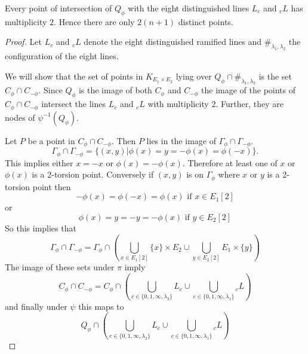 \documentclass[10pt,a4paper]{amsart}
\newcommand {\KE}{{K_{E_1 \times E_2}}}
\newcommand {\lb}{{\lambda}}
\begin{document}
\begin{lem} Every point of intersection of $Q_{\phi}$ with the  eight distinguished lines $L_c$ and ${}_cL$ has multiplicity $2$. Hence there are only  $2(n+1)$ distinct points. 
	\label{doubleintersection} 
\end{lem}

\begin{proof}
	
	Let $L_c$ and ${}_cL$ denote the eight distinguished ramified  lines and $\#_{\lb_1,\lb_2}$ the configuration of the eight lines. 
	
	
	 We will show that the set of points in $\KE$ lying over  $Q_{\phi} \cap  \#_{\lb_1,\lb_2}$  is  the set 
	$C_{\phi}\cap C_{-\phi}$. Since $Q_{\phi}$ is the image of both $C_{\phi}$ and $C_{-\phi}$ the image of the points of $C_{\phi} \cap C_{-\phi}$ intersect the lines $L_c$ and ${}_cL$  with  multiplicity $2$. Further, they are nodes of $\psi^{-1}(Q_{\phi})$.
	
	Let $P$ be a point in $C_{\phi} \cap C_{-\phi}$. Then $P$ lies in the image of $\Gamma_{\phi} \cap \Gamma_{-\phi}$. 
	$$\Gamma_{\phi} \cap \Gamma_{-\phi}=\{(x,y)| \phi(x)=y=-\phi(x)=\phi(-x)\}.$$
	This implies either $x=-x$ or $\phi(x)=-\phi(x)$. Therefore at least one of $x$ or $\phi(x)$ is a 2-torsion point. Conversely if $(x,y)$ is on $\Gamma_{\phi}$ where $x$ or $y$ is a 2- torsion point then 
	$$-\phi(x)=\phi(-x)=\phi(x)  \text{ if } x \in E_1[2]$$
	or  
	$$\phi(x)=y=-y=-\phi(x) \text{ if }  y \in E_2[2]$$
	So this implies that 
	$$\Gamma_{\phi} \cap \Gamma_{-\phi} =\Gamma_{\phi} \cap \left( \bigcup_{x\in E_1[2]}  \{x\} \times E_2 \cup \bigcup_{y \in E_2[2]} E_1 \times \{y\}\right)$$
	The image of these sets under $\pi$ imply 
    $$C_{\phi} \cap C_{-\phi}=C_{\phi} \cap \left(\bigcup_{c \in \{0,1,\infty,\lb_2\}} L_c \cup \bigcup_{c \in \{0,1,\infty,\lb_1\}} {}_cL\right)$$
    and finally under $\psi$ this maps to 
    $$Q_{\phi} \cap \left(\bigcup_{c \in \{0,1,\infty,\lb_2\}} L_c \cup \bigcup_{c \in \{0,1,\infty,\lb_1\}} {}_cL\right)$$
	
\end{proof}
\end{document}
